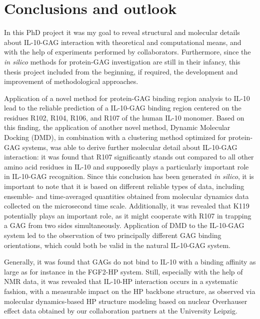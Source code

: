 \chapter{Conclusions and outlook}

In this PhD project it was my goal to reveal structural and molecular details
about IL-10-GAG interaction with theoretical and computational means, and with
the help of experiments performed by collaborators. Furthermore, since the
\textit{in silico} methods for protein-GAG investigation are still in their
infancy, this thesis project included from the beginning, if required, the
development and improvement of methodological approaches.

Application of a novel method for protein-GAG binding region analysis to IL-10
lead to the reliable prediction of a IL-10-GAG binding region centered on the
residues R102, R104, R106, and R107 of the human IL-10 monomer. Based on this
finding, the application of another novel method, Dynamic Molecular Docking
(DMD), in combination with a clustering method optimized for protein-GAG
systems, was able to derive further molecular detail about IL-10-GAG
interaction: it was found that R107 significantly stands out compared to all
other amino acid residues in IL-10 and supposedly plays a particularly important
role in IL-10-GAG recognition. Since this conclusion has been generated
\textit{in silico}, it is important to note that it is based on different
reliable types of data, including ensemble- and time-averaged quantities
obtained from molecular dynamics data collected on the microsecond time scale.
Additionally, it was revealed that K119 potentially plays an important role, as
it might cooperate with R107 in trapping a GAG from two sides simultaneously.
Application of DMD to the IL-10-GAG system led to the observation of two
principally different GAG binding orientations, which could both be valid in the
natural IL-10-GAG system.

Generally, it was found that GAGs do not bind to IL-10 with a binding affinity
as large as for instance in the FGF2-HP system. Still, especially with the help
of NMR data, it was revealed that IL-10-HP interaction occurs in a systematic
fashion, with a measurable impact on the HP backbone structure, as observed via
molecular dynamics-based HP structure modeling based on nuclear Overhauser
effect data obtained by our collaboration partners at the University Leipzig.


